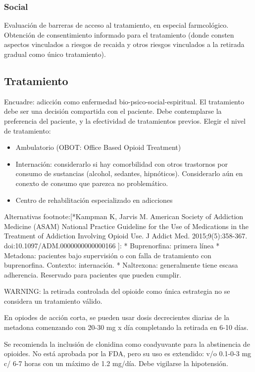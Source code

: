 \subsubsection{Social}
Evaluación de barreras de acceso al tratamiento, en especial farmcológico.
Obtención de consentimiento informado para el tratamiento (donde consten aspectos vinculados a riesgos de recaida y otros riesgos vinculados a la retirada gradual como único tratamiento).
\subsection*{Tratamiento}
Encuadre: adicción como enfermedad bio-psico-social-espiritual.
El tratamiento debe ser una decisión compartida con el paciente. Debe contemplarse la preferencia del paciente, y la efectividad de tratamientos previos. Elegir el nivel de tratamiento:
\begin{itemize}
	\item Ambulatorio (OBOT: Office Based Opioid Treatment)
	\item Internación: considerarlo si hay comorbilidad con otros trastornos por consumo de sustancias (alcohol, sedantes, hipnóticos). Considerarlo aún en conexto de consumo que parezca no problemático.
	\item Centro de rehabilitación especializado en adicciones
\end{itemize}

Alternativas footnote:[*Kampman K, Jarvis M. American Society of Addiction Medicine (ASAM) National Practice Guideline for the Use of Medications in the Treatment of Addiction Involving Opioid Use. J Addict Med. 2015;9(5):358-367. doi:10.1097/ADM.0000000000000166
]:
  * Buprenorfina: primera línea
  * Metadona: pacientes bajo supervisión o con falla de tratamiento con buprenorfina. Contexto: internación.
  * Naltrexona: generalmente tiene escasa adherencia. Reservado para pacientes que pueden cumplir.

WARNING: la retirada controlada del opioide como única estrategia no se considera un tratamiento válido.

En opiodes de acción corta, se pueden usar dosis decrecientes diarias de la metadona comenzando con 20-30 mg x día completando la retirada en 6-10 días.

Se recomienda la inclusión de clonidina como coadyuvante para la abstinencia de opioides. No está aprobada por la FDA, pero su uso es extendido: v/o 0.1-0-3 mg c/ 6-7 horas con un máximo de 1.2 mg/día. Debe vigilarse la hipotensión.

